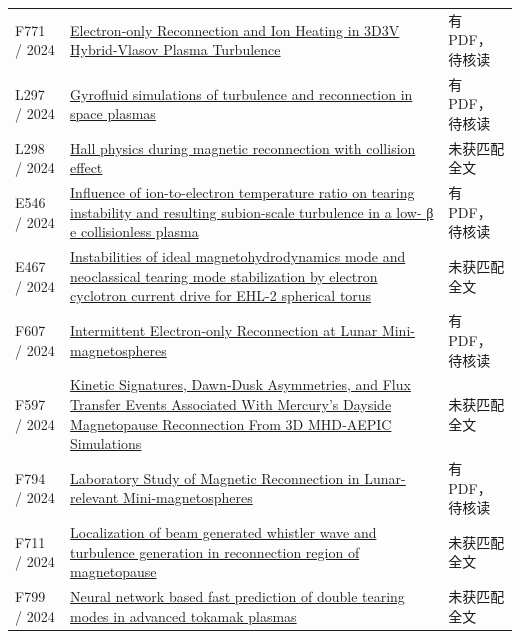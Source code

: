 \begin{longtable}{P{24mm}P{97mm}P{27mm}}
F771 / 2024 & \href{https://doi.org/10.3847/1538-4357/ad6a19}{Electron-only Reconnection and Ion Heating in 3D3V Hybrid-Vlasov Plasma Turbulence} & 有PDF，待核读\\

L297 / 2024 & \href{https://doi.org/10.1016/j.fpp.2024.100055}{Gyrofluid simulations of turbulence and reconnection in space plasmas} & 有PDF，待核读\\

L298 / 2024 & \href{https://doi.org/10.1088/1361-6587/ad2b8f}{Hall physics during magnetic reconnection with collision effect} & 未获匹配全文\\

E546 / 2024 & \href{https://doi.org/10.1063/5.0185897}{Influence of ion-to-electron temperature ratio on tearing instability and resulting subion-scale turbulence in a low- β e collisionless plasma} & 有PDF，待核读\\

E467 / 2024 & \href{https://doi.org/10.1088/2058-6272/ada421}{Instabilities of ideal magnetohydrodynamics mode and neoclassical tearing mode stabilization by electron cyclotron current drive for EHL-2 spherical torus} & 未获匹配全文\\

F607 / 2024 & \href{https://doi.org/10.3847/2041-8213/ad2774}{Intermittent Electron-only Reconnection at Lunar Mini-magnetospheres} & 有PDF，待核读\\

F597 / 2024 & \href{https://doi.org/10.1029/2024ja032669}{Kinetic Signatures,  Dawn‐Dusk Asymmetries,  and Flux Transfer Events Associated With Mercury's Dayside Magnetopause Reconnection From 3D MHD‐AEPIC Simulations} & 未获匹配全文\\

F794 / 2024 & \href{https://doi.org/10.3847/1538-4357/ad4fff}{Laboratory Study of Magnetic Reconnection in Lunar-relevant Mini-magnetospheres} & 有PDF，待核读\\

F711 / 2024 & \href{https://doi.org/10.1063/5.0169397}{Localization of beam generated whistler wave and turbulence generation in reconnection region of magnetopause} & 未获匹配全文\\

F799 / 2024 & \href{https://doi.org/10.1063/5.0229910}{Neural network based fast prediction of double tearing modes in advanced tokamak plasmas} & 未获匹配全文\\


\end{longtable}
